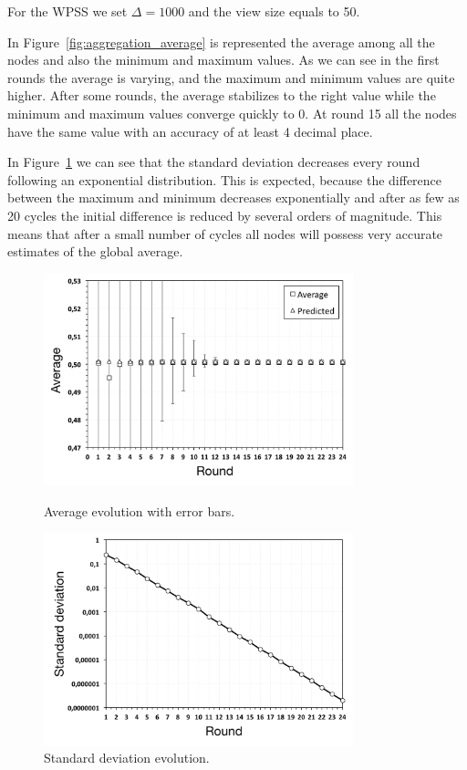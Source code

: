 For the \ac{WPSS} we set $\Delta = 1000$ and the view size equals to 50. 

In Figure~\ref{fig:aggregation_average} is represented the average among all the nodes and also the minimum and maximum values. As we can see in the first rounds the average is varying, and the maximum and minimum values are quite higher. After some rounds, the average stabilizes to the right value while the minimum and maximum values converge quickly to 0. At round 15 all the nodes have the same value with an accuracy of at least 4 decimal place. 

In Figure~\ref{fig:aggregation_standard_deviation} we can see that the standard deviation decreases every round following an exponential distribution. This is expected, because the difference between the maximum and minimum decreases exponentially and after as few as 20 cycles the initial difference is reduced by several orders of magnitude. This means that after a small number of cycles all nodes will possess very accurate estimates of the global average.

\begin{figure}[p]
\centering
\includegraphics[keepaspectratio=true, width=0.8\textwidth]{images/aggregation_average}
\caption{Average evolution with error bars.}
\label{fig:aggregation_average}
\includegraphics[keepaspectratio=true, width=0.8\textwidth]{images/aggregation_standard_deviation}
\caption{Standard deviation evolution.}
\label{fig:aggregation_standard_deviation}
\end{figure}

